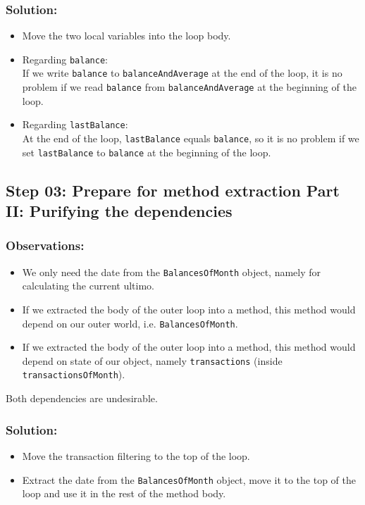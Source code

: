 \documentclass[a4paper,fleqn,titlepage,11pt]{article}
\begin{document}
\subsubsection*{Solution:}

\begin{itemize}
\item Move the two local variables into the loop body.
\item Regarding \texttt{balance}: \\
If we write \texttt{balance} to \texttt{balanceAndAverage} at the end of the loop, it is no problem if we read \texttt{balance} from \texttt{balanceAndAverage} at the beginning of the loop.
\item Regarding \texttt{lastBalance}: \\
At the end of the loop, \texttt{lastBalance} equals \texttt{balance}, so it is no problem if we set \texttt{lastBalance} to \texttt{balance} at the beginning of the loop.
\end{itemize}

\subsection*{Step 03: Prepare for method extraction Part II: Purifying the dependencies}

\subsubsection*{Observations:}
\begin{itemize}
\item We only need the date from the \texttt{BalancesOfMonth} object, namely for calculating the current ultimo.
\item If we extracted the body of the outer loop into a method, this method would depend on our outer world, i.e. \texttt{BalancesOfMonth}.
\item If we extracted the body of the outer loop into a method, this method would depend on state of our object, namely \texttt{transactions} (inside \texttt{transactionsOfMonth}).
\end{itemize}

Both dependencies are undesirable.

\subsubsection*{Solution:}

\begin{itemize}
\item Move the transaction filtering to the top of the loop.
\item Extract the date from the \texttt{BalancesOfMonth} object, move it to the top of the loop and use it in the rest of the method body.
\end{itemize}
\end{document}
